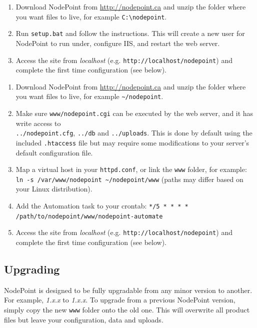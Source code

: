 \documentclass[11pt]{article}
\begin{document}
{
\begin{enumerate}
\item Download NodePoint from \url{http://nodepoint.ca} and unzip the folder where you want files to live, for example \texttt{C:\textbackslash nodepoint}.
\item Run \texttt{setup.bat} and follow the instructions. This will create a new user for NodePoint to run under, configure IIS, and restart the web server.
\item Access the site from \textit{localhost} (e.g. \texttt{http://localhost/nodepoint}) and complete the first time configuration (see below).
\end{enumerate}
}
{
\begin{enumerate}
\item Download NodePoint from \url{http://nodepoint.ca} and unzip the folder where you want files to live, for example \texttt{\textasciitilde/nodepoint}.
\item Make sure \texttt{www/nodepoint.cgi} can be executed by the web server, and it has write access to\\ \texttt{../nodepoint.cfg}, \texttt{../db} and \texttt{../uploads}. This is done by default using the included \texttt{.htaccess} file but may require some modifications to your server's default configuration file.
\item Map a virtual host in your \texttt{httpd.conf}, or link the \texttt{www} folder, for example: \texttt{ln -s /var/www/nodepoint \textasciitilde/nodepoint/www} (paths may differ based on your Linux distribution).
\item Add the Automation task to your crontab: \texttt{*/5 * * * * /path/to/nodepoint/www/nodepoint-automate}
\item Access the site from \textit{localhost} (e.g. \texttt{http://localhost/nodepoint}) and complete the first time configuration (see below).
\end{enumerate}
}

\subsection{Upgrading}
NodePoint is designed to be fully upgradable from any minor version to another. For example, \textit{1.x.x} to \textit{1.x.x}. To upgrade from a previous NodePoint version, simply copy the new \texttt{www} folder onto the old one. This will overwrite all product files but leave your configuration, data and uploads.
\end{document}
